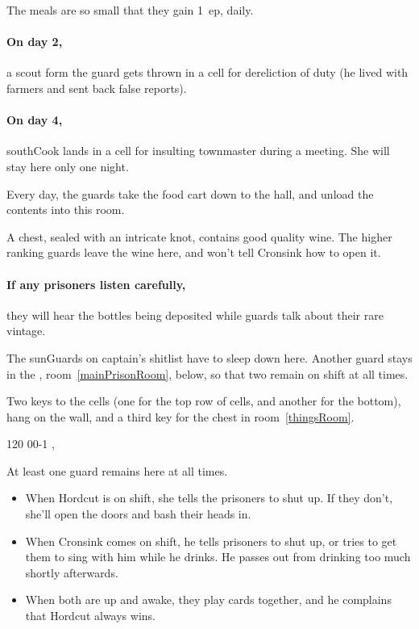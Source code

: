 \begin{multicols}{2}
The meals are so small that they gain 1~\gls{ep}, daily.

\paragraph{On day 2,}
a scout form the \gls{guard} gets thrown in a cell for dereliction of duty (he lived with farmers and sent back false reports).

\paragraph{On day 4,}
\gls{southCook} lands in a cell for insulting \gls{townmaster} during a meeting.
She will stay here only one night.


Every day, the guards take the food cart down to the hall, and unload the contents into this room.

A chest, sealed with an intricate knot, contains good quality wine.
The higher ranking guards leave the wine here, and won't tell Cronsink how to open it.

\paragraph{If any prisoners listen carefully,}
they will hear the bottles being deposited while guards talk about their rare vintage.


The \glspl{sunGuard} on \gls{captain}'s shitlist have to sleep down here.
Another guard stays in the , room~\ref{mainPrisonRoom}, below, so that two remain on shift at all times.

Two keys to the cells (one for the top row of cells, and another for the bottom), hang on the wall, and a third key for the chest in room~\ref{thingsRoom}.

%
  {{1}{2}{0}}%
  {{0}{0}{-1}}%
  {%
    \shortsword
    \partialplate
  }%
  {\brawler, \berserker}%
  {\lootSmall}%
  {}%


At least one guard remains here at all times.
\begin{itemize}
  \item
  When Hordcut is on shift, she tells the prisoners to shut up.
  If they don't, she'll open the doors and bash their heads in.
  \item
  When Cronsink comes on shift, he tells prisoners to shut up, or tries to get them to sing with him while he drinks.
  He passes out from drinking too much shortly afterwards.
  \item
  When both are up and awake, they play cards together, and he complains that Hordcut always wins.
\end{itemize}


\end{multicols}
